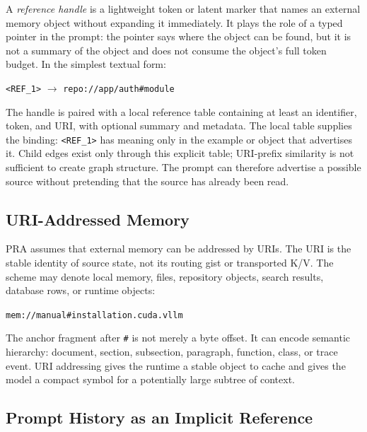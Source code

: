 \documentclass[11pt]{article}
\begin{document}
A \emph{reference handle} is a lightweight token or latent marker that names an external memory object without expanding it immediately.  It plays the role of a typed
pointer in the prompt: the pointer says where the object can be found, but it is not a
summary of the object and does not consume the object's full token budget.  In the
simplest textual form:

\begin{center}
\texttt{<REF\_1>} $\rightarrow$ \texttt{repo://app/auth\#module}
\end{center}

The handle is paired with a local reference table containing at least an identifier,
token, and URI, with optional summary and metadata.  The local table supplies the
binding: \texttt{<REF\_1>} has meaning only in the example or object that advertises it.
Child edges exist only through this explicit table; URI-prefix similarity is not
sufficient to create graph structure.  The prompt can therefore advertise a possible
source without pretending that the source has already been read.

\subsection{URI-Addressed Memory}

PRA assumes that external memory can be addressed by URIs. The URI is the stable identity
of source state, not its routing gist or transported K/V. The scheme may denote local
memory, files, repository objects, search results, database rows, or runtime objects:

\begin{center}
\texttt{mem://manual\#installation.cuda.vllm}
\end{center}

The anchor fragment after \texttt{\#} is not merely a byte offset. It can encode semantic hierarchy: document, section, subsection, paragraph, function, class, or trace event. URI addressing gives the runtime a stable object to cache and gives the model a compact symbol for a potentially large subtree of context.

\subsection{Prompt History as an Implicit Reference}
\end{document}
